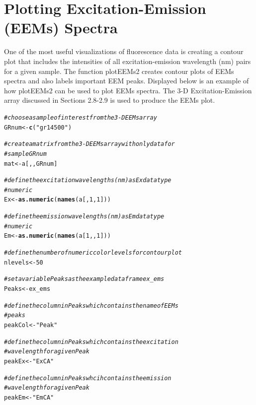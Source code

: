 \documentclass[a4paper,11pt]{article}\usepackage[]{graphicx}\usepackage[]{color}
\makeatletter
\newcommand{\hlnum}[1]{\textcolor[rgb]{0.686,0.059,0.569}{#1}}%
\newcommand{\hlstr}[1]{\textcolor[rgb]{0.192,0.494,0.8}{#1}}%
\newcommand{\hlcom}[1]{\textcolor[rgb]{0.678,0.584,0.686}{\textit{#1}}}%
\newcommand{\hlstd}[1]{\textcolor[rgb]{0.345,0.345,0.345}{#1}}%
\newcommand{\hlkwb}[1]{\textcolor[rgb]{0.69,0.353,0.396}{#1}}%
\newcommand{\hlkwd}[1]{\textcolor[rgb]{0.737,0.353,0.396}{\textbf{#1}}}%
\newenvironment{kframe}{%
 \def\at@end@of@kframe{}%
 \ifinner\ifhmode%
  \def\at@end@of@kframe{\end{minipage}}%
  \begin{minipage}{\columnwidth}%
 \fi\fi%
 \def\FrameCommand##1{\hskip\@totalleftmargin \hskip-\fboxsep
 \colorbox{shadecolor}{##1}\hskip-\fboxsep
     \hskip-\linewidth \hskip-\@totalleftmargin \hskip\columnwidth}%
 \MakeFramed {\advance\hsize-\width
   \@totalleftmargin\z@ \linewidth\hsize
   \@setminipage}}%
 {\par\unskip\endMakeFramed%
 \at@end@of@kframe}
\newenvironment{knitrout}{}{} %
\makeatother
\begin{document}
\section{Plotting Excitation-Emission (EEMs) Spectra}
One of the most useful visualizations of fluorescence data is creating a contour plot that includes the intensities of all excitation-emission wavelength (nm) pairs for a given sample. The function plotEEMs2 creates contour plots of EEMs spectra and also labels important EEM peaks. Displayed below is an example of how plotEEMs2 can be used to plot EEMs spectra. The 3-D Excitation-Emission array discussed in Sections 2.8-2.9 is used to produce the EEMs plot.

\begin{knitrout}
\color{fgcolor}\begin{kframe}
\begin{alltt}
\hlcom{# choose a sample of interest from the 3-D EEMs array}
\hlstd{GRnum} \hlkwb{<-} \hlkwd{c}\hlstd{(}\hlstr{"gr14500"}\hlstd{)}

\hlcom{# create a matrix from the 3-D EEMs array with only data for}
\hlcom{# sample GRnum}
\hlstd{mat} \hlkwb{<-} \hlstd{a[, , GRnum]}

\hlcom{# define the excitation wavelengths (nm) as Ex data type}
\hlcom{# numeric}
\hlstd{Ex} \hlkwb{<-} \hlkwd{as.numeric}\hlstd{(}\hlkwd{names}\hlstd{(a[,} \hlnum{1}\hlstd{,} \hlnum{1}\hlstd{]))}

\hlcom{# define the emission wavelengths (nm) as Em data type}
\hlcom{# numeric}
\hlstd{Em} \hlkwb{<-} \hlkwd{as.numeric}\hlstd{(}\hlkwd{names}\hlstd{(a[}\hlnum{1}\hlstd{, ,} \hlnum{1}\hlstd{]))}

\hlcom{# define the number of numeric color levels for contour plot}
\hlstd{nlevels} \hlkwb{<-} \hlnum{50}

\hlcom{# set a variable Peaks as the example dataframe ex_ems}
\hlstd{Peaks} \hlkwb{<-} \hlstd{ex_ems}

\hlcom{# define the column in Peaks which contains the name of EEMs}
\hlcom{# peaks}
\hlstd{peakCol} \hlkwb{<-} \hlstr{"Peak"}

\hlcom{# define the column in Peaks which contains the excitation}
\hlcom{# wavelength for a given Peak}
\hlstd{peakEx} \hlkwb{<-} \hlstr{"ExCA"}

\hlcom{# define the column in Peaks whcih contains the emission}
\hlcom{# wavelength for a given Peak}
\hlstd{peakEm} \hlkwb{<-} \hlstr{"EmCA"}


\end{alltt}
\end{kframe}
\end{knitrout}
\end{document}
